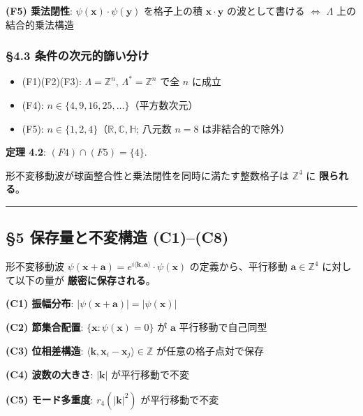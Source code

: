 \documentclass[
  a4paper,11pt]{ltjsarticle}
\providecommand{\tightlist}{%
  \setlength{\itemsep}{0pt}\setlength{\parskip}{0pt}}
\theoremstyle{definition}
\theoremstyle{remark}
\begin{document}
\textbf{(F5) 乗法閉性}: \(\psi(\mathbf{x}) \cdot \psi(\mathbf{y})\)
を格子上の積 \(\mathbf{x} \cdot \mathbf{y}\) の波として書ける
\(\Leftrightarrow\) \(\Lambda\) 上の結合的乗法構造

\subsubsection{§4.3
条件の次元的篩い分け}\label{ux6761ux4ef6ux306eux6b21ux5143ux7684ux7be9ux3044ux5206ux3051}

\begin{itemize}
\tightlist
\item
  (F1)(F2)(F3): \(\Lambda = \mathbb{Z}^n\), \(\Lambda^* = \mathbb{Z}^n\)
  で全 \(n\) に成立
\item
  (F4): \(n \in \{4, 9, 16, 25, \ldots\}\)（平方数次元）
\item
  (F5): \(n \in \{1, 2, 4\}\)（\(\mathbb{R}, \mathbb{C}, \mathbb{H}\);
  八元数 \(n = 8\) は非結合的で除外）
\end{itemize}

\textbf{定理 4.2}: \((F4) \cap (F5) = \{4\}\).

形不変移動波が球面整合性と乗法閉性を同時に満たす整数格子は
\(\mathbb{Z}^4\) に \textbf{限られる}。

\begin{center}\rule{0.5\linewidth}{0.5pt}\end{center}

\subsection{§5 保存量と不変構造
(C1)--(C8)}\label{ux4fddux5b58ux91cfux3068ux4e0dux5909ux69cbux9020-c1c8}

形不変移動波
\(\psi(\mathbf{x} + \mathbf{a}) = e^{i\langle \mathbf{k}, \mathbf{a} \rangle} \cdot \psi(\mathbf{x})\)
の定義から、平行移動 \(\mathbf{a} \in \mathbb{Z}^4\) に対して以下の量が
\textbf{厳密に保存される}。

\textbf{(C1) 振幅分布}:
\(|\psi(\mathbf{x} + \mathbf{a})| = |\psi(\mathbf{x})|\)

\textbf{(C2) 節集合配置}: \(\{\mathbf{x} : \psi(\mathbf{x}) = 0\}\) が
\(\mathbf{a}\) 平行移動で自己同型

\textbf{(C3) 位相差構造}:
\(\langle \mathbf{k}, \mathbf{x}_i - \mathbf{x}_j \rangle \in \mathbb{Z}\)
が任意の格子点対で保存

\textbf{(C4) 波数の大きさ}: \(|\mathbf{k}|\) が平行移動で不変

\textbf{(C5) モード多重度}: \(r_4(|\mathbf{k}|^2)\) が平行移動で不変
\end{document}
